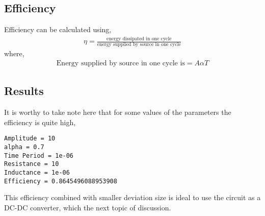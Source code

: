  \subsection{Efficiency}
 Efficiency can be calculated using, 
 \begin{align*}
     \eta = \frac{\text{energy dissipated in one cycle}}{\text{energy supplied by source in one cycle}}
 \end{align*}
 where,
 \begin{align*}
    \text{Energy supplied by source in one cycle is} = A \alpha T
 \end{align*}
 \subsection{Results}
 It is worthy to take note here that for some values of the parameters the efficiency is quite high, 
 \begin{verbatim}
Amplitude = 10
alpha = 0.7
Time Period = 1e-06
Resistance = 10
Inductance = 1e-06
Efficiency = 0.8645496088953908    
 \end{verbatim}
This efficiency combined with smaller deviation size is ideal to use the circuit as a DC-DC converter, which the next topic of discussion. 